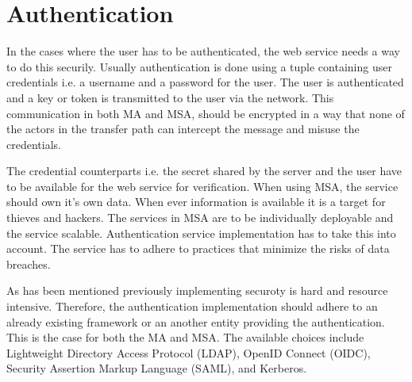 \section{Authentication}
\begin{sloppypar}
    In the cases where the user has to be authenticated, the web service needs 
    a way to do this securily. Usually authentication is done using a tuple 
    containing user credentials i.e. a username and a password for the user. The
    user is authenticated and a key or token is transmitted to the user via the 
    network. This communication in both MA and MSA, should be encrypted in a way 
    that none of the actors in the transfer path can intercept the message and 
    misuse the credentials.
\end{sloppypar}
\begin{sloppypar}
    The credential counterparts i.e. the secret shared by the server and the 
    user have to be available for the web service for verification. When using 
    MSA, the service should own it's own data. When ever information is 
    available it is a target for thieves and hackers. The services in MSA are 
    to be individually deployable and the service scalable. Authentication 
    service implementation has to take this into account. The service has to 
    adhere to practices that minimize the risks of data breaches. 
\end{sloppypar}
\begin{sloppypar}
    As has been mentioned previously implementing securoty is hard and resource 
    intensive. Therefore, the authentication implementation should adhere to an 
    already existing framework or an another entity providing the 
    authentication. This is the case for both the MA and MSA. The available 
    choices include Lightweight Directory Access Protocol (LDAP), OpenID 
    Connect (OIDC), Security Assertion Markup Language (SAML), and Kerberos.
\end{sloppypar}



